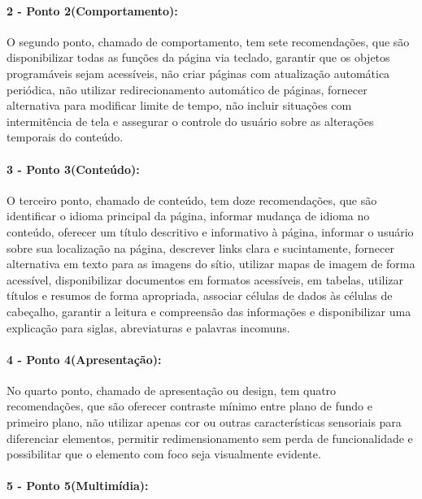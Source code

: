 \documentclass[a4paper]{article}
\begin{document}
\begin{titlepage}
\paragraph{2 - Ponto 2(Comportamento): }

O segundo ponto, chamado de comportamento, tem sete recomendações, que são disponibilizar todas as funções da página via teclado, garantir que os objetos programáveis sejam acessíveis, não criar páginas com atualização automática periódica, não utilizar redirecionamento automático de páginas, fornecer alternativa para modificar limite de tempo, não incluir situações com intermitência de tela e assegurar o controle do usuário sobre as alterações temporais do conteúdo.

\paragraph{3 - Ponto 3(Conteúdo): }

O terceiro ponto, chamado de conteúdo, tem doze recomendações, que são identificar o idioma principal da página, informar mudança de idioma no conteúdo, oferecer um título descritivo e informativo à página, informar o usuário sobre sua localização na página, descrever links clara e sucintamente, fornecer alternativa em texto para as imagens do sítio, utilizar mapas de imagem de forma acessível, disponibilizar documentos em formatos acessíveis, em tabelas, utilizar títulos e resumos de forma apropriada, associar células de dados às células de cabeçalho, garantir a leitura e compreensão das informações e disponibilizar uma explicação para siglas, abreviaturas e palavras incomuns.

\paragraph{4 - Ponto 4(Apresentação): }

No quarto ponto, chamado de apresentação ou design, tem quatro recomendações, que são oferecer contraste mínimo entre plano de fundo e primeiro plano, não utilizar apenas cor ou outras características sensoriais para diferenciar elementos, permitir redimensionamento sem perda de funcionalidade e possibilitar que o elemento com foco seja visualmente evidente.

\paragraph{5 - Ponto 5(Multimídia): }


\end{titlepage}
\end{document}
